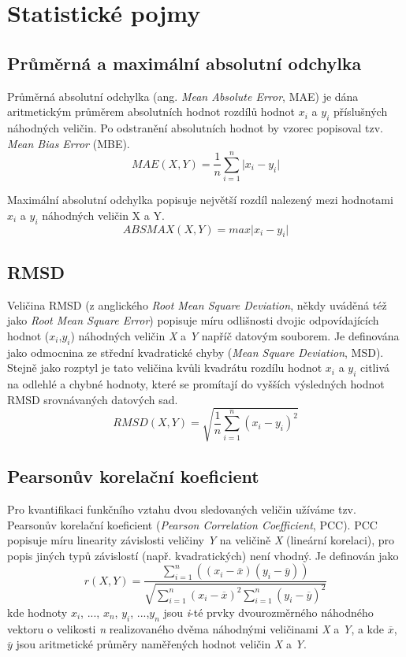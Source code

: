 \section{Statistické pojmy}
\subsection{Průměrná a maximální absolutní odchylka}
Průměrná absolutní odchylka (ang. \textit{Mean Absolute Error}, MAE) je dána aritmetickým průměrem absolutních hodnot rozdílů hodnot $x_i$ a $y_i$ příslušných náhodných veličin. Po odstranění absolutních hodnot by vzorec popisoval tzv. \textit{Mean Bias Error} (MBE). 
\begin{equation}
\label{}
    MAE(X,Y) = \frac{1}{n} \sum_{i=1}^n \lvert x_i - y_i \rvert
\end{equation}

Maximální absolutní odchylka popisuje největší rozdíl nalezený mezi hodnotami $x_i$ a $y_i$ náhodných veličin X a Y.
\begin{equation}
    ABSMAX(X,Y) = max \lvert x_i - y_i \rvert
\end{equation}

\subsection{RMSD}
Veličina RMSD (z anglického \textit{Root Mean Square Deviation}, někdy uváděná též jako \textit{Root Mean Square Error}) popisuje míru odlišnosti dvojic odpovídajících hodnot ($x_i$,$y_i$) náhodných veličin \textit{X} a \textit{Y} napříč datovým souborem. Je definována jako odmocnina ze střední kvadratické chyby (\textit{Mean Square Deviation}, MSD). Stejně jako rozptyl je tato veličina kvůli kvadrátu rozdílu hodnot $x_i$ a $y_i$ citlivá na odlehlé a chybné hodnoty, které se promítají do vyšších výsledných hodnot RMSD srovnávaných datových sad. 
\begin{equation}
    RMSD(X,Y) = \sqrt{\frac{1}{n} \sum_{i=1}^n (x_i - y_i)^2} 
\end{equation}
\subsection{Pearsonův korelační koeficient}
Pro kvantifikaci funkčního vztahu dvou sledovaných veličin užíváme tzv. Pearsonův korelační koeficient (\textit{Pearson Correlation Coefficient}, PCC). PCC popisuje míru linearity závislosti veličiny \textit{Y} na veličině \textit{X} (lineární korelaci), pro popis jiných typů závislostí (např. kvadratických) není vhodný. Je definován jako
\begin{equation}
\label{pearson}
    r(X,Y) = \frac
    {\sum_{i=1}^n ((x_i - \overline{x})(y_i - \overline{y}))}
    {\sqrt{\sum_{i=1}^n (x_i - \overline{x})^2 \sum_{i=1}^n (y_i - \overline{y})^2}}
\end{equation}
kde hodnoty $x_i$, ..., $x_n$, $y_i$, ...,$y_n$ jsou \textit{i}-té prvky dvourozměrného náhodného vektoru o velikosti \textit{n} realizovaného dvěma náhodnými veličinami \textit{X} a \textit{Y}, a kde $\overline{x}$, $\overline{y}$ jsou aritmetické průměry naměřených hodnot veličin \textit{X} a \textit{Y}. 

